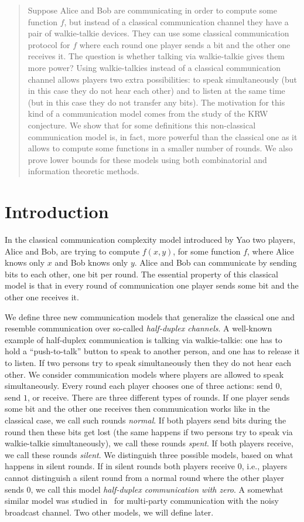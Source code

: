\begin{abstract}
Suppose Alice and Bob are communicating in order to compute some function $f$, but instead of a classical communication channel they have a pair of walkie-talkie devices. They can use some classical communication protocol for $f$ where each round one player sends a bit and the other one receives it. The question is whether talking via walkie-talkie gives them more power? Using walkie-talkies instead of a classical communication channel allows players two extra possibilities: to speak simultaneously (but in this case they do not hear each other) and to listen at the same time (but in this case they do not transfer any bits). The motivation for this kind of a communication model comes from the study of the KRW conjecture. We show that for some definitions this non-classical communication model is, in fact, more powerful than the classical one as it allows to compute some functions in a smaller number of rounds. We also prove lower bounds for these models using both combinatorial and information theoretic methods.
\end{abstract}


\section{Introduction}
In the classical communication complexity model introduced by Yao \cite{Yao79}  two players, Alice and Bob,  are trying to compute $f(x,y)$, for some function $f$, where Alice knows only $x$ and Bob knows only $y$. Alice and Bob can communicate by sending bits to each other, one bit
per round. The essential property of this classical model is that in every round of communication one player
sends some bit and the other one receives it.

We define three new communication models that generalize the classical one and resemble
communication over so-called \emph{half-duplex channels}.  A well-known example of half-duplex
communication is talking via walkie-talkie: one has to hold a ``push-to-talk'' button to speak to another person, and one has to release it to listen. 
If two persons try to speak simultaneously then they do not hear each other. 
We consider communication models where players are allowed to speak simultaneously. 
Every round each player chooses one of three
actions: send $0$, send $1$, or receive. There are three different types of rounds.
If one player sends some bit and the other one receives then
communication works like in the classical case, we call such rounds \emph{normal}. 
If both players send bits during the round then these bits get lost (the same happens if two persons try
to speak via walkie-talkie simultaneously), we call these rounds \emph{spent}. 
If both players receive, we call these rounds \emph{silent}. We distinguish three
possible models, based on what happens in silent rounds. If in silent rounds
both players receive $0$, i.e., players cannot distinguish a silent round from a normal round
where the other player sends $0$, we call this model \emph{half-duplex communication with zero}. A somewhat similar model was studied in~\cite{EKS17} for multi-party communication with the noisy broadcast channel. Two other models, we will define later.

